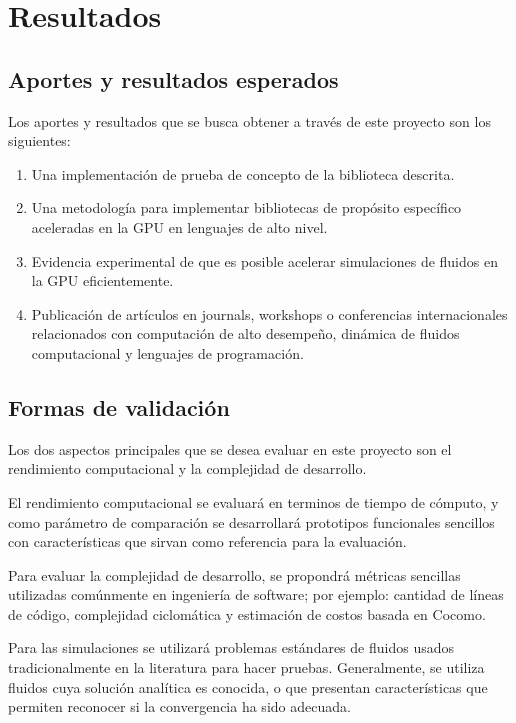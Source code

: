 \documentclass[11pt,spanish]{article}
\begin{document}
 \newpage
\section{Resultados}

\subsection{Aportes y resultados esperados}
Los aportes y resultados que se busca obtener a través de este proyecto son los
siguientes:
\begin{enumerate}
    \item Una implementación de prueba de concepto de la biblioteca descrita.
    \item Una metodología para implementar bibliotecas de propósito específico
        aceleradas en la GPU en lenguajes de alto nivel.
    \item Evidencia experimental de que es posible acelerar simulaciones de
        fluidos en la GPU eficientemente.
    \item Publicación de artículos en journals, workshops o
        conferencias internacionales
        relacionados con
        computación de alto desempeño,
        dinámica de fluidos computacional y
        lenguajes de programación.
\end{enumerate}

\subsection{Formas de validación}
Los dos aspectos principales que se desea evaluar en este proyecto son el
rendimiento computacional y la complejidad de desarrollo.

El rendimiento computacional se evaluará en terminos de tiempo de cómputo, y
como parámetro de comparación se desarrollará prototipos funcionales sencillos
con características que sirvan como referencia para la evaluación.

Para evaluar la complejidad de desarrollo, se propondrá métricas sencillas
utilizadas comúnmente en ingeniería de software; por ejemplo: cantidad de líneas de código,
complejidad ciclomática y estimación de costos basada en Cocomo.

Para las simulaciones se utilizará problemas estándares de fluidos usados
tradicionalmente en la literatura para hacer pruebas.  Generalmente, se utiliza
fluidos cuya solución analítica es conocida, o que presentan características que
permiten reconocer si la convergencia ha sido adecuada.
\end{document}
